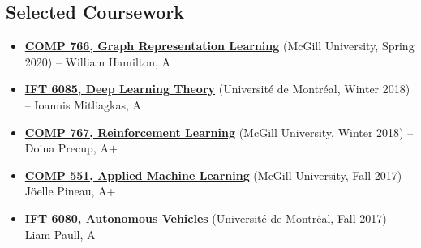 \documentclass[letterpaper,11pt]{article}
\newcommand{\resumeItem}[2]{
  \item\small{\textbf{#1}{ #2 }}
}
\newcommand{\resumeSubItem}[2]{\resumeItem{#1}{#2}}
\newcommand{\resumeSubHeadingListStart}{\begin{itemize}[leftmargin=*]}
\newcommand{\resumeSubHeadingListEnd}{\end{itemize}}
\begin{document}
\begin{justify}
\section{Selected Coursework}
\resumeSubHeadingListStart
\resumeSubItem{\href{https://cs.mcgill.ca/~wlh/comp766/}{COMP 766, Graph Representation Learning}}{(McGill University, Spring 2020) -- William Hamilton, A}
\resumeSubItem{\href{https://mitliagkas.github.io/ift6085-dl-theory-class/}{IFT 6085, Deep Learning Theory}}{(Universit\'e de Montr\'eal, Winter 2018) -- Ioannis Mitliagkas, A}
\resumeSubItem{\href{https://www.cs.mcgill.ca/~dprecup/courses/rl.html}{COMP 767, Reinforcement Learning}}{(McGill University, Winter 2018) -- Doina Precup, A+}
\resumeSubItem{\href{https://www.cs.mcgill.ca/~jpineau/comp551/index.html}{COMP 551, Applied Machine Learning}}{(McGill University, Fall 2017) -- J\"oelle Pineau, A+}
\resumeSubItem{\href{http://liampaull.ca/courses/duckietown/index.html}{IFT 6080, Autonomous Vehicles}}{(Universit\'e de Montr\'eal, Fall 2017) -- Liam Paull, A}
\resumeSubHeadingListEnd


\end{justify}
\end{document}
